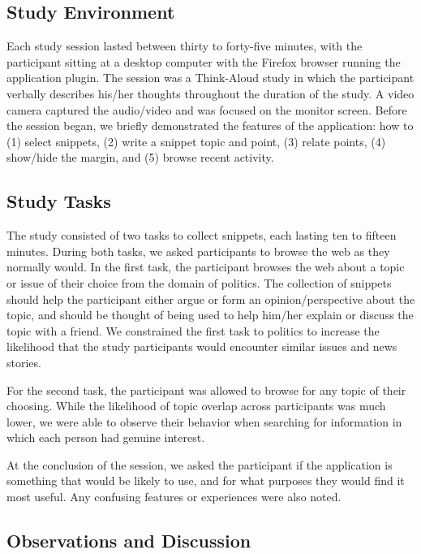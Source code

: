 \documentclass{chi2009}
\begin{document}
\subsection{Study Environment}
Each study session lasted between thirty to forty-five minutes, with the participant sitting at a desktop computer with the Firefox browser running the application plugin. The session was a Think-Aloud study in which the participant verbally describes his/her thoughts throughout the duration of the study. A video camera captured the audio/video and was focused on the monitor screen. Before the session began, we briefly demonstrated the features of the application: how to (1) select snippets, (2) write a snippet topic and point, (3) relate points, (4) show/hide the margin, and (5) browse recent activity.

\subsection{Study Tasks}
The study consisted of two tasks to collect snippets, each lasting ten to fifteen minutes. During both tasks, we asked participants to browse the web as they normally would. In the first task, the participant browses the web about a topic or issue of their choice from the domain of politics. The collection of snippets should help the participant either argue or form an opinion/perspective about the topic, and should be thought of being used to help him/her explain or discuss the topic with a friend.  We constrained the first task to politics to increase the likelihood that the study participants would encounter similar issues and news stories.

For the second task, the participant was allowed to browse for any topic of their choosing. While the likelihood of topic overlap across participants was much lower, we were able to observe their behavior when searching for information in which each person had genuine interest.

At the conclusion of the session, we asked the participant if the application is something that would be likely to use, and for what purposes they would find it most useful. Any confusing features or experiences were also noted.

\subsection{Observations and Discussion}
\end{document}
